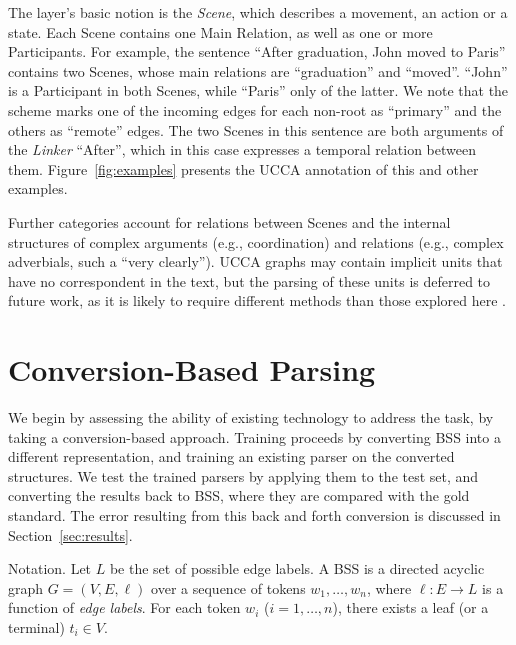 \documentclass[11pt]{article}
\makeatletter
\newcommand{\secref}[1]{Section~\ref{#1}}
\newcommand{\figref}[1]{Figure~\ref{#1}}
\renewcommand{\paragraph}{
  \@startsection{paragraph}{4}
  {\z@}{.5ex \@plus .5ex \@minus .2ex}{-1em}
  {\normalfont\normalsize\bfseries}
}
\makeatother
\begin{document}
The layer's basic notion is the {\it Scene}, which describes a movement, an action or a state.
Each Scene contains one Main Relation, as well as one or more Participants.
For example, the sentence ``After graduation, John moved to Paris'' contains two Scenes,
whose main relations are ``graduation'' and ``moved''. ``John'' is a Participant in both Scenes,
while ``Paris'' only of the latter.
We note that the scheme marks one of the incoming edges for each non-root
as ``primary'' and the others as ``remote'' edges.
The two Scenes in this sentence are both arguments of the \textit{Linker} ``After'',
which in this case expresses a temporal relation between them.
\figref{fig:examples} presents the UCCA annotation of this and other examples.

Further categories account for relations between Scenes and the internal structures of
complex arguments (e.g., coordination) and relations
(e.g., complex adverbials, such a ``very clearly''). UCCA graphs may contain implicit
units that have no correspondent in the text, but the parsing of these
units is deferred to future work, as it is likely to require different methods
than those explored here \cite{roth2015inducing}.







\section{Conversion-Based Parsing}\label{sec:conversion_approach}

We begin by assessing the ability of existing technology to address the task,
by taking a conversion-based approach. Training proceeds by 
converting BSS into a different representation,
and training an existing parser on the converted structures.
We test the trained parsers by applying them to the test set,
and converting the results back to BSS, where they are compared
with the gold standard.
The error resulting from this back and forth conversion is discussed in
\secref{sec:results}.

\paragraph{Notation.}
Let $L$ be the set of possible edge labels.
A BSS is a directed acyclic graph $G=(V,E, \ell)$
over a sequence of tokens $w_1, \ldots, w_n$,
where $\ell:E\to L$ is a function of \textit{edge labels}.
For each token $w_i$ ($i=1, \ldots, n$), there exists a leaf (or a terminal) $t_i \in V$.
\end{document}
